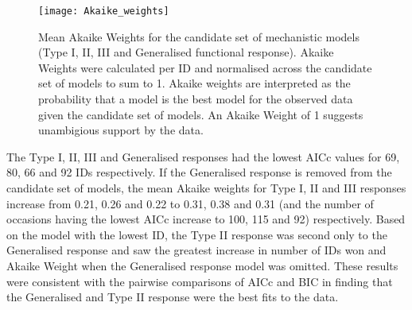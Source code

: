 \documentclass[11pt]{article}
\begin{document}
            \begin{figure}[htpb]
                \texttt{[image: Akaike\_weights]}\label{fig:3}
                \centering
                \caption{Mean Akaike Weights for the candidate set of mechanistic models (Type I, II, III and Generalised functional response). Akaike Weights were calculated per ID and normalised across the candidate set of models to sum to 1. Akaike weights are interpreted as the probability that a model is the best model for the observed data given the candidate set of models. An Akaike Weight of 1 suggests unambigious support by the data.}
            \end{figure}

            The Type I, II, III and Generalised responses had the lowest AICc values for 69, 80, 66 and 92 IDs respectively. If the Generalised response is removed from the candidate set of models, the mean Akaike weights for Type I, II and III responses increase from 0.21, 0.26 and 0.22 to 0.31, 0.38 and 0.31 (and the number of occasions having the lowest AICc increase to 100, 115 and 92) respectively. Based on the model with the lowest ID, the Type II response was second only to the Generalised response and saw the greatest increase in number of IDs won and Akaike Weight when the Generalised response model was omitted. These results were consistent with the pairwise comparisons of AICc and BIC in finding that the Generalised and Type II response were the best fits to the data.
\end{document}
